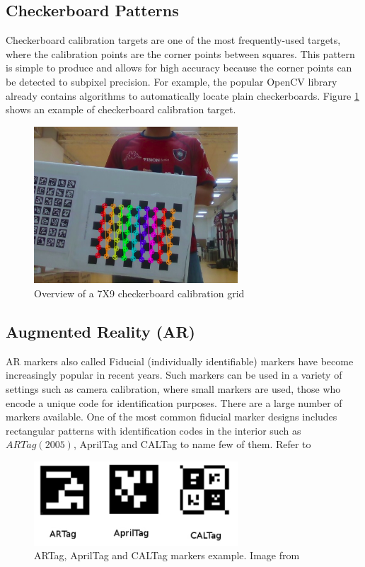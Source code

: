 \subsection{Checkerboard Patterns}

Checkerboard calibration targets are one of the most frequently-used targets, where the calibration points are the corner points between squares. This pattern is simple to produce and allows for high accuracy because the corner points can be detected to subpixel precision. For example, the popular OpenCV library already contains algorithms to automatically locate plain checkerboards. Figure \ref{fig:target1} shows an example of checkerboard calibration target.


\begin{figure}[!h]
\begin{center}
\includegraphics[width=3in]{figures03/openCV1.png}
\caption{Overview of a 7X9 checkerboard calibration grid }%
\label{fig:target1}
\end{center}
\end{figure}

\subsection{Augmented Reality (AR)}
AR markers also called Fiducial (individually identifiable) markers have become increasingly popular in recent years. Such markers can be used in a variety of settings such as camera calibration, where small markers are used, those who encode a unique code for identification purposes. There are a large number of markers available. One of the most common fiducial marker designs includes rectangular patterns with identification codes in the interior such as $ARTag (2005)$, AprilTag and CALTag to name few of them.  Refer to \cite{fiducialTargets} 


\begin{figure}[!h]
\begin{center}
\includegraphics[width=3in]{figures03/fiducials.png}
\caption{ARTag, AprilTag and CALTag markers example. Image from \cite{fiducialTargets}}
\label{fig:fiducial}
\end{center}
\end{figure}

